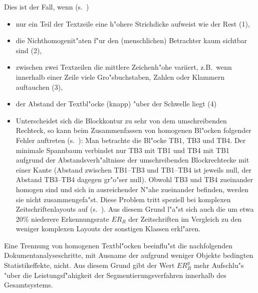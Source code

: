 \newpage
Dies ist der Fall, wenn (s.\ )
\begin{itemize}
  \item nur ein Teil der Textzeile eine h"ohere Strichdicke aufweist wie der Rest (1), 
    
  \item die Nichthomogenit"aten f"ur den (menschlichen) Betrachter kaum sichtbar sind (2), 
  
  \item zwischen zwei Textzeilen die mittlere Zeichenh"ohe variiert,
  z.B.\ wenn innerhalb einer Zeile viele Gro"sbuchstaben, Zahlen oder Klammern auftauchen (3),
  
  \item der Abstand der Textbl"ocke (knapp) "uber der Schwelle liegt (4)

  \item Unterscheidet sich die Blockkontur zu sehr von dem umschreibenden Rechteck, so kann
   beim Zusammenfassen von homogenen Bl"ocken folgender Fehler auftreten 
   (s.\ ): Man betrachte die Bl"ocke TB1, TB3 und TB4. 
   Der minimale Spannbaum verbindet nur TB3 mit TB1 und TB4 mit TB1 aufgrund der
   Abstandsverh"altnisse der umschreibenden Blockrechtecke mit einer Kante (Abstand 
   zwischen TB1--TB3 und TB1--TB4 ist jeweils null, der Abstand TB3--TB4 dagegen gr"o"ser null).
   Obwohl TB3 und TB4 zueinander homogen sind und sich in
   ausreichender N"ahe zueinander befinden, werden sie nicht zusammengefa"st.
   Diese Problem tritt speziell bei komplexen Zeitschriftenlayouts auf 
   (s.\ ). Aus diesem Grund l"a"st sich
   auch die um etwa 20\% niederere Erkennungsrate $ER_{R}$ der Zeitschriften im Vergleich zu den
   weniger komplexen Layouts der sonstigen Klassen erkl"aren.
   
\end{itemize}

Eine Trennung von homogenen Textbl"ocken beeinflu"st die nachfolgenden Dokumentanalyseschritte,
mit Ausname der aufgrund weniger Objekte bedingten Statistikeffekte, nicht. 
Aus diesem Grund gibt der Wert $ER_{R}^{g}$ mehr Aufschlu"s "uber die
Leistungsf"ahigkeit der Segmentierungsverfahren innerhalb des Gesamtsystems.

